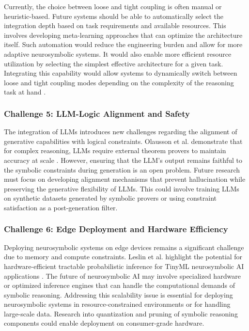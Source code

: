 \documentclass{article}
\begin{document}
\label{sec:challenge_4_automated_integration_depth_}

Currently, the choice between loose and tight coupling is often manual or heuristic-based. Future systems should be able to automatically select the integration depth based on task requirements and available resources. This involves developing meta-learning approaches that can optimize the architecture itself. Such automation would reduce the engineering burden and allow for more adaptive neurosymbolic systems. It would also enable more efficient resource utilization by selecting the simplest effective architecture for a given task. Integrating this capability would allow systems to dynamically switch between loose and tight coupling modes depending on the complexity of the reasoning task at hand \cite{bekkum2021modular}.

\subsubsection{Challenge 5: LLM-Logic Alignment and Safety}

\label{sec:challenge_5_llm_logic_alignment_and_safe}

The integration of LLMs introduces new challenges regarding the alignment of generative capabilities with logical constraints. Olausson et al. demonstrate that for complex reasoning, LLMs require external theorem provers to maintain accuracy at scale \cite{olausson2023linc}. However, ensuring that the LLM's output remains faithful to the symbolic constraints during generation is an open problem. Future research must focus on developing alignment mechanisms that prevent hallucination while preserving the generative flexibility of LLMs. This could involve training LLMs on synthetic datasets generated by symbolic provers or using constraint satisfaction as a post-generation filter.

\subsubsection{Challenge 6: Edge Deployment and Hardware Efficiency}

\label{sec:challenge_6_edge_deployment_and_hardware}

Deploying neurosymbolic systems on edge devices remains a significant challenge due to memory and compute constraints. Leslin et al. highlight the potential for hardware-efficient tractable probabilistic inference for TinyML neurosymbolic AI applications \cite{leslin2025hardwareefficient}. The future of neurosymbolic AI may involve specialized hardware or optimized inference engines that can handle the computational demands of symbolic reasoning. Addressing this scalability issue is essential for deploying neurosymbolic systems in resource-constrained environments or for handling large-scale data. Research into quantization and pruning of symbolic reasoning components could enable deployment on consumer-grade hardware.
\end{document}
